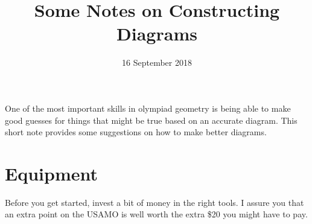 \documentclass[11pt]{scrartcl}
\begin{document}
\title{Some Notes on Constructing Diagrams}
\date{16 September 2018}
\maketitle

One of the most important skills in olympiad geometry is being
able to make good guesses for things that might be true based
on an accurate diagram.
This short note provides some suggestions on how to make better diagrams.

\section{Equipment}
Before you get started, invest a bit of money in the right tools.
I assure you that an extra point on the USAMO is well worth the extra \$20
you might have to pay.
\end{document}

